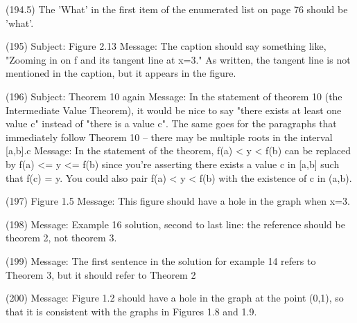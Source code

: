 {(194.5)  The 'What' in the first item of the enumerated list on page 76 should be 'what'.

(195)  Subject: Figure 2.13   Message: The caption should say something like, "Zooming in on f and its tangent line at x=3." As written, the tangent line is not mentioned in the caption, but it appears in the figure.


(196)  Subject: Theorem 10 again  Message: In the statement of theorem 10 (the Intermediate Value Theorem), it would be nice to say "there exists at least one value c" instead of "there is a value c". The same goes for the paragraphs that immediately follow Theorem 10 -- there may be multiple roots in the interval [a,b].c    Message: In the statement of the theorem, f(a) < y < f(b) can be replaced by f(a) <= y <= f(b) since you're asserting there exists a value c in [a,b] such that f(c) = y. You could also pair f(a) < y < f(b) with the existence of c in (a,b).
%
%

(197)  Figure 1.5   Message: This figure should have a hole in the graph when x=3.

(198)  Message: Example 16 solution, second to last line: the reference should be theorem 2, not theorem 3.

(199)  Message: The first sentence in the solution for example 14 refers to Theorem 3, but it should refer to Theorem 2

(200)  Message: Figure 1.2 should have a hole in the graph at the point (0,1), so that it is consistent with the graphs in Figures 1.8 and 1.9.

}
